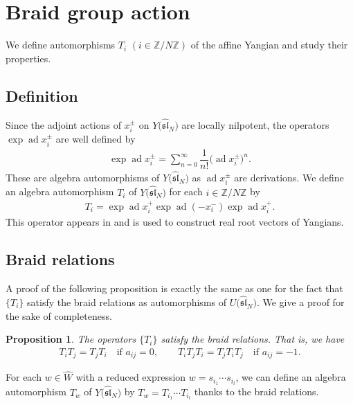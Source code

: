 \documentclass[11pt]{article}
\newtheorem{prop}[thm]{Proposition}
\theoremstyle{definition}
\numberwithin{equation}{section}
\DeclareMathOperator{\ad}{ad}
\newcommand{\bbZ}{\mathbb{Z}}
\newcommand{\affY}{Y\big(\affsl\big)}
\newcommand{\affsl}{\hat{\mathfrak{sl}}_N}
\begin{document}
\section{Braid group action}\label{section3}

We define automorphisms $T_i$ $(i \in \bbZ/N\bbZ)$ of the affine Yangian and study their properties.

\subsection{Definition}

Since the adjoint actions of $x_i^{\pm}$ on $\affY$ are locally nilpotent, the operators $\exp\ad x_i^{\pm}$ are well defined by
\begin{gather*}
\exp\ad x_i^{\pm} = \sum_{n=0}^{\infty} \dfrac{1}{n!} \big(\ad x_i^{\pm}\big)^n.
\end{gather*}
These are algebra automorphisms of $\affY$ as $\ad x_i^{\pm}$ are derivations. We define an algebra automorphism $T_i$ of $\affY$ for each $i \in \bbZ/N\bbZ$ by
\begin{gather*}
T_i = \exp\ad x_i^{+} \exp\ad (-x_i^{-}) \exp\ad x_i^{+}.
\end{gather*}
This operator appears in \cite{MR3861718} and is used to construct real root vectors of Yangians.

\subsection{Braid relations}

A proof of the following proposition is exactly the same as one for the fact that $\{T_i\}$ satisfy the braid relations as automorphisms of $U\big(\affsl\big)$. We give a proof for the sake of completeness.

\begin{prop}\label{prop:braid}The operators $\{T_i\}$ satisfy the braid relations. That is, we have
\begin{gather*}
T_i T_j = T_j T_i \quad \text{if $a_{ij}=0$},\qquad T_i T_j T_i = T_j T_i T_j \quad \text{if $a_{ij}=-1$}.
\end{gather*}
\end{prop}
For each $w \in \hat{W}$ with a reduced expression $w=s_{i_1} \cdots s_{i_l}$, we can define an algebra automorphism $T_w$ of $\affY$ by $T_w = T_{i_1} \cdots T_{i_l}$ thanks to the braid relations.
\end{document}
